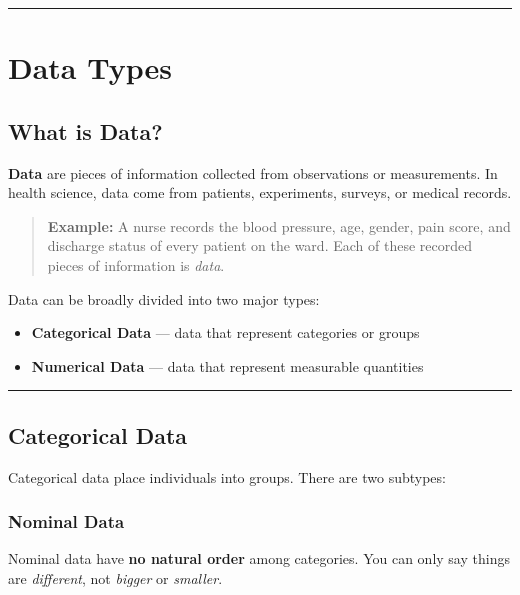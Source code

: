 \documentclass[
  12pt,
  letterpaper,
]{book}
\providecommand{\tightlist}{%
  \setlength{\itemsep}{0pt}\setlength{\parskip}{0pt}}
\begin{document}
\begin{center}\rule{0.5\linewidth}{0.5pt}\end{center}


\chapter{Data Types}\label{data-types}

\section{What is Data?}\label{what-is-data}

\textbf{Data} are pieces of information collected from observations or
measurements. In health science, data come from patients, experiments,
surveys, or medical records.

\begin{quote}
\textbf{Example:} A nurse records the blood pressure, age, gender, pain
score, and discharge status of every patient on the ward. Each of these
recorded pieces of information is \emph{data}.
\end{quote}

Data can be broadly divided into two major types:

\begin{itemize}
\tightlist
\item
  \textbf{Categorical Data} --- data that represent categories or groups
\item
  \textbf{Numerical Data} --- data that represent measurable quantities
\end{itemize}

\begin{center}\rule{0.5\linewidth}{0.5pt}\end{center}

\section{Categorical Data}\label{categorical-data}

Categorical data place individuals into groups. There are two subtypes:

\subsection{Nominal Data}\label{nominal-data}

Nominal data have \textbf{no natural order} among categories. You can
only say things are \emph{different}, not \emph{bigger} or
\emph{smaller}.
\end{document}
